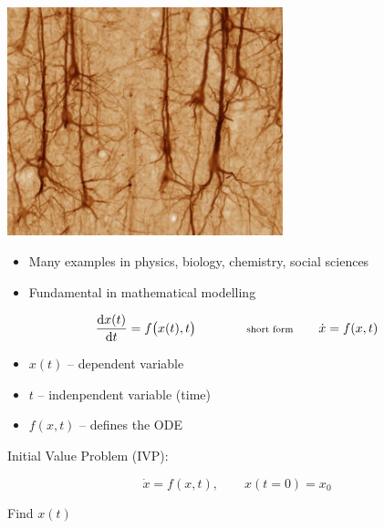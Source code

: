 \begin{frame}
\begin{minipage}{0.48\textwidth}
\begin{center}
  \includegraphics[draft=false,width=0.6\textwidth]{neuron.jpg}
 \end{center}
\end{minipage}
\pause
\vspace{2ex}

\begin{itemize}
 \item Many examples in physics, biology, chemistry, social sciences
 \item Fundamental in mathematical modelling
\end{itemize}

\end{frame}



\begin{frame}
 

 $$\frac{\mbox{d} x(t)}{\mbox{d} t} = f\big(x(t) , t\big) \qquad \qquad {\scriptsize \text{short form}} \qquad \dot{x} = f(x,t)
$$

 \begin{itemize}
  \item $x(t)$ -- dependent variable
  \item $t$ -- indenpendent variable (time)
  \item $f(x,t)$ -- defines the ODE
 \end{itemize}

\vspace{4ex}

 Initial Value Problem (IVP):

 $$\dot x = f( x , t ) ,\qquad x(t=0) = x_0$$

 \centerline{Find $x(t)$}

\end{frame}


